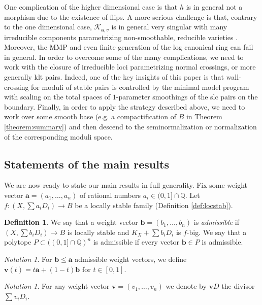 \documentclass[11pt]{amsart}
\theoremstyle{definition}
\newtheorem{definition}[theorem]{Definition}
\theoremstyle{remark}
\newtheorem{notation}[theorem]{Notation}
\newcommand{\sK}{\mathscr{K}}
\newcommand{\bfa}{\mathbf{a}}
\newcommand{\bfv}{\mathbf{v}}
\newcommand{\bfb}{\mathbf{b}}
\begin{document}
	One complication of the higher dimensional case is that $h$ is in general not a morphism due to the existence of flips. A more serious challenge is that, contrary to the one dimensional case, $\sK_{\bfa, v}$ is in general very singular with many irreducible components parametrizing non-smoothable, reducible varieties \cite{Vakil, Persson}. Moreover, the MMP and even finite generation of the log canonical ring can fail in general. In order to overcome some of the many complications, we need to work with the closure of irreducible loci parametrizing normal crossings, or more generally klt pairs. Indeed, one of the key insights of this paper is that wall-crossing for moduli of stable pairs is controlled by the minimal model program with scaling on the total spaces of $1$-parameter smoothings of the slc pairs on the boundary. Finally, in order to apply the strategy described above, we need to work over some smooth base (e.g. a compactification of $B$ in Theorem \ref{theorem:summary}) and then descend to the seminormalization or normalization of the corresponding moduli space. 
	
	
	
	\subsection{Statements of the main results} \label{sec:mainthm}
	
	We are now ready to state our main results in full generality. Fix some weight vector $\bfa = (a_1, \ldots, a_n)$ of rational numbers $a_i \in (0,1] \cap \mathbb{Q}$. Let $f : (X, \sum a_i D_i) \to B$ be a locally stable family (Definition \ref{def:locstab}). 
	
	\begin{definition}\label{def:admissible} We say that a weight vector $\bfb = (b_1, \ldots, b_n)$ is \emph{admissible} if $(X, \sum b_i D_i) \to B$ is locally stable and $K_X + \sum b_i D_i$ is $f$-big. We say that a polytope
		$
		P \subset ((0,1] \cap \mathbb{Q})^n
		$
		is admissible if every vector $\bfb \in P$ is admissible. 
	\end{definition} 
	
	\begin{notation}
		For $\bfb \le \bfa$ admissible weight vectors, we define $\bfv(t) = t\bfa + (1-t)\bfb$ for $t \in [0,1]$.
	\end{notation}
	\begin{notation} For any weight vector $\bfv = (v_1, \ldots, v_n)$ we denote by $\bfv D$ the divisor $\sum v_i D_i$. 
	\end{notation}
	
\end{document}
